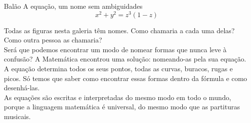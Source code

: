 \begin{surferPage}{Balão}
A equa\c c\~ao, um nome sem ambiguidades \\
\smallskip
\[x^2 + y^2	= z^3	(1 - z) \]


\singlespacing
Todas as figuras nesta galeria t\^em nomes. Como chamaria a cada uma delas? Como outra pessoa as chamaria?\\
\vspace{0.3cm}
Ser\'a que podemos encontrar um modo de nomear formas que nunca leve \`a confus\~ao? 
A Matem\'atica encontrou uma solu\c c\~ao: nomeando-as pela sua equa\c c\~ao. A equa\c c\~ao determina todos os seus pontos, todas as curvas, buracos, rugas e picos. S\'o temos que saber como encontrar essas formas dentro da f\'ormula e como desenh\'a-las.\\
\vspace{0.3cm}
As equa\c c\~oes s\~ao escritas e interpretadas do mesmo modo em todo o mundo, porque a linguagem matem\'atica \'e universal, do mesmo modo que  as partituras musicais.
\end{surferPage}
